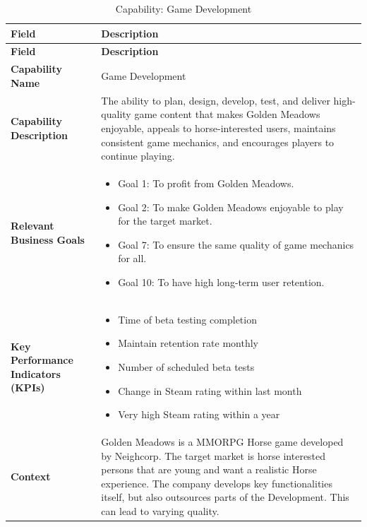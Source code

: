 \documentclass{article}
\begin{document}
\begin{longtable}{L{0.27\textwidth} L{0.68\textwidth}}
    \caption{Capability: Game Development}
    \label{tab:game-development-capability} \\

    \toprule
    \textbf{Field} & \textbf{Description} \\
    \midrule
    \endfirsthead

    \toprule
    \textbf{Field} & \textbf{Description} \\
    \midrule
    \endhead

    \bottomrule
    \endfoot

    \textbf{Capability Name}
    & Game Development \\

    \textbf{Capability Description}
    & The ability to plan, design, develop, test, and deliver high-quality game content that makes Golden Meadows enjoyable, appeals to horse-interested users, maintains consistent game mechanics, and encourages players to continue playing. \\

    \textbf{Relevant Business Goals}
    & \begin{itemize}
        \item Goal 1: To profit from Golden Meadows.
        \item Goal 2: To make Golden Meadows enjoyable to play
              for the target market.
        \item Goal 7: To ensure the same quality of game mechanics
              for all.
        \item Goal 10: To have high long-term user retention.
    \end{itemize} \\

    \textbf{Key Performance Indicators (KPIs)}
    & \begin{itemize}
        \item Time of beta testing completion
        \item Maintain retention rate monthly
        \item Number of scheduled beta tests
        \item Change in Steam rating within last month
        \item Very high Steam rating within a year
    \end{itemize} \\

    \textbf{Context}
    & Golden Meadows is a MMORPG Horse game developed by Neighcorp. The target market is horse interested persons that are young and want a realistic Horse experience. The company develops key functionalities itself, but also outsources parts of the Development. This can lead to varying quality.\\


\end{longtable}
\end{document}
